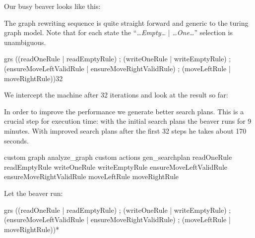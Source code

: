 Our busy beaver looks like this:
\begin{center}
\end{center}
The graph rewriting sequence is quite straight forward and generic to the turing graph model. Note that for each state the ``\emph{\dots Empty\dots} | \emph{\dots One\dots}'' selection is unambiguous.
\begin{grshell}[firstnumber=last]
  grs ((readOneRule | readEmptyRule) ; (writeOneRule | writeEmptyRule) ; (ensureMoveLeftValidRule | ensureMoveRightValidRule) ; (moveLeftRule | moveRightRule)){32}

\end{grshell}
We intercept the machine after 32 iterations and look at the result so far:
\begin{center}
\end{center}
In order to improve the performance we generate better search plans. This is a crucial step for execution time: with the initial search plans the beaver runs for 9 minutes. With improved search plans after the first 32 steps he takes about 170 seconds.
\begin{grshell}[firstnumber=last]
custom graph analyze_graph
custom actions gen_searchplan readOneRule readEmptyRule writeOneRule writeEmptyRule ensureMoveLeftValidRule ensureMoveRightValidRule moveLeftRule moveRightRule

\end{grshell}

Let the beaver run:
\begin{grshell}[firstnumber=last]
  grs ((readOneRule | readEmptyRule) ; (writeOneRule | writeEmptyRule) ; (ensureMoveLeftValidRule | ensureMoveRightValidRule) ; (moveLeftRule | moveRightRule))*

\end{grshell}

